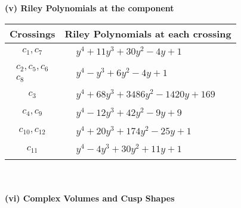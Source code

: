 \documentclass[1p]{elsarticle_modified}
\theoremstyle{definition}
\begin{document}
\newpage\renewcommand{\arraystretch}{1}
\flushleft \textbf{(v) Riley Polynomials at the component}\newline \\
\begin{tabular}{m{50pt}|m{274pt}}
Crossings & \hspace{64pt}Riley Polynomials at each crossing \\
\hline $$\begin{aligned}c_{1},c_{7}\end{aligned}$$&$\begin{aligned}
&y^4+11 y^3+30 y^2-4 y+1
\end{aligned}$\\
\hline $$\begin{aligned}c_{2},c_{5},c_{6}\\c_{8}\end{aligned}$$&$\begin{aligned}
&y^4- y^3+6 y^2-4 y+1
\end{aligned}$\\
\hline $$\begin{aligned}c_{3}\end{aligned}$$&$\begin{aligned}
&y^4+68 y^3+3486 y^2-1420 y+169
\end{aligned}$\\
\hline $$\begin{aligned}c_{4},c_{9}\end{aligned}$$&$\begin{aligned}
&y^4-12 y^3+42 y^2-9 y+9
\end{aligned}$\\
\hline $$\begin{aligned}c_{10},c_{12}\end{aligned}$$&$\begin{aligned}
&y^4+20 y^3+174 y^2-25 y+1
\end{aligned}$\\
\hline $$\begin{aligned}c_{11}\end{aligned}$$&$\begin{aligned}
&y^4-4 y^3+30 y^2+11 y+1
\end{aligned}$\\
\hline
\end{tabular}\\~\\
\newpage\flushleft \textbf{(vi) Complex Volumes and Cusp Shapes}
\end{document}
